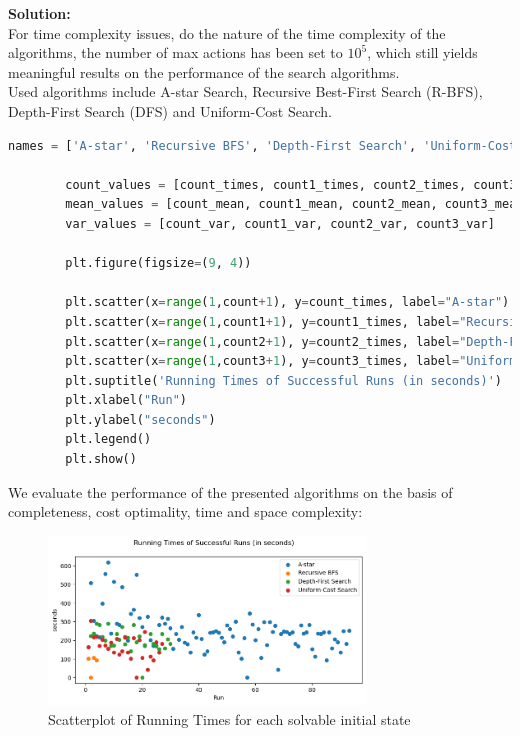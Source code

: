 \documentclass{article}
\newcommand{\solution}{\textbf{\large Solution:}}
\begin{document}
    \solution \\
    
    For time complexity issues, do the nature of the time complexity of the algorithms, the number of max actions has been set to $10^5$, which still yields meaningful results on the performance of the search algorithms. \\
    
    Used algorithms include A-star Search, Recursive Best-First Search (R-BFS), Depth-First Search (DFS) and Uniform-Cost Search. \\
    
    \begin{lstlisting}[language=Python, caption=Python Code for scatterplot of the running times of Succesful Runs (in seconds) for each Search Algorithm]
    	names = ['A-star', 'Recursive BFS', 'Depth-First Search', 'Uniform-Cost Search']
    	
    	count_values = [count_times, count1_times, count2_times, count3_times]
    	mean_values = [count_mean, count1_mean, count2_mean, count3_mean]
    	var_values = [count_var, count1_var, count2_var, count3_var]
    	
    	plt.figure(figsize=(9, 4))
    	
    	plt.scatter(x=range(1,count+1), y=count_times, label="A-star")
    	plt.scatter(x=range(1,count1+1), y=count1_times, label="Recursive BFS")
    	plt.scatter(x=range(1,count2+1), y=count2_times, label="Depth-First Search")
    	plt.scatter(x=range(1,count3+1), y=count3_times, label="Uniform-Cost Search")
    	plt.suptitle('Running Times of Successful Runs (in seconds)')
    	plt.xlabel("Run")
    	plt.ylabel("seconds")
    	plt.legend()
    	plt.show()
    \end{lstlisting}
		
	We evaluate the performance of the presented algorithms on the basis of completeness, cost optimality, time and space complexity:
	
	\begin{figure}[h]
		\centering
		\includegraphics[width=0.75\textwidth]{images/img1.png}
		\caption{Scatterplot of Running Times for each solvable initial state}
	\end{figure}
\end{document}
